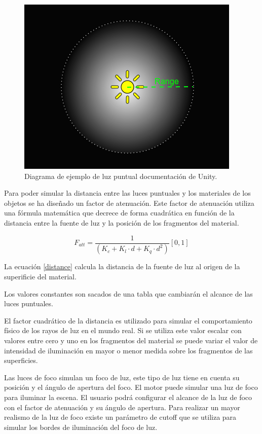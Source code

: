 \documentclass[a4paper, 17pt]{book}
\begin{document}
\begin{figure}[hbt!]
    \centering
    \includegraphics[scale=0.5, keepaspectratio]{img/PointLightDiagram.png}
    \caption{Diagrama de ejemplo de luz puntual documentación de Unity.}
    \label{figura:PointLightDiagram}
\end{figure}

Para poder simular la distancia entre las luces puntuales y los materiales de los objetos se ha diseñado un factor de atenuación. Este factor
de atenuación utiliza una fórmula matemática que decrece de forma cuadrática en función de la distancia entre la fuente de luz y la posición
de los fragmentos del material.

\begin{equation} \label{distance}
F_{att} = \frac{1} {(K_{c} + K_{l} \cdot d + K_{q} \cdot d^2)} [0 , 1]
\end{equation}

La ecuación \ref{distance} calcula la distancia de la fuente de luz al origen de la superificie del material.

Los valores constantes son sacados de una tabla que cambiarán el alcance de las luces puntuales. 

El factor cuadrático de la distancia es utilizado para simular el comportamiento físico de los rayos de luz
en el mundo real. Si se utiliza este valor escalar con valores entre cero y uno en los fragmentos del material
se puede variar el valor de intensidad de iluminación en mayor o menor medida sobre los fragmentos de las superficies.

Las luces de foco simulan un foco de luz, este tipo de luz tiene en cuenta su posición y el ángulo de apertura
del foco. El motor puede simular una luz de foco para iluminar la escena. El usuario podrá configurar el alcance
de la luz de foco con el factor de atenuación y su ángulo de apertura. Para realizar un mayor realismo de la
luz de foco existe un parámetro de cutoff que se utiliza para simular los bordes de iluminación del foco de luz.
\end{document}
